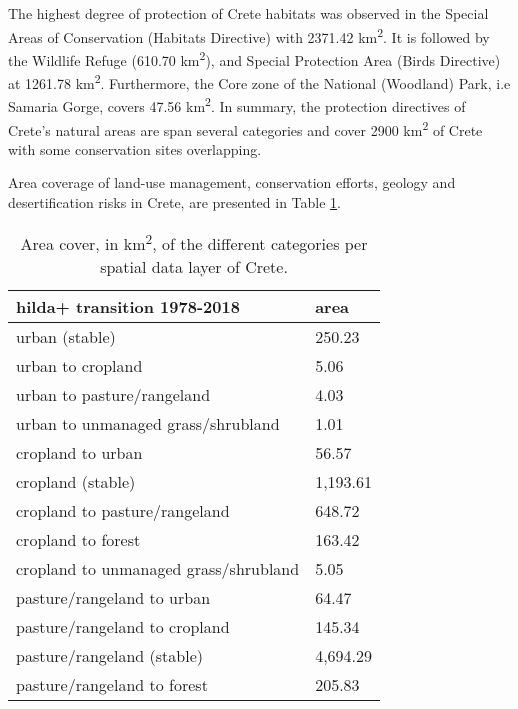 The highest degree of protection of Crete habitats was observed in the Special Areas
of Conservation (Habitats Directive) with 2371.42 km\textsuperscript{2}.
It is followed by the Wildlife Refuge (610.70 km\textsuperscript{2}),
and Special Protection Area (Birds Directive) at 1261.78 km\textsuperscript{2}.
Furthermore, the Core zone of the National (Woodland) Park, i.e Samaria Gorge, covers 47.56 km\textsuperscript{2}.
In summary, the protection directives of Crete's natural areas are span several categories and cover 2900 km\textsuperscript{2}
of Crete with some conservation sites overlapping.

Area coverage of land-use management, conservation efforts, geology and
desertification risks in Crete, are presented in Table \ref{table:crete_data_cube_area}.

\begin{longtable}{ll}
    \caption{Area cover, in km\textsuperscript{2}, of the different categories per spatial data layer of Crete. \label{table:crete_data_cube_area}} \\
\textbf{hilda+ transition 1978-2018}               & \textbf{area}    \\
\endfirsthead
%
\endhead
%
urban (stable)                                     & 250.23           \\
urban to cropland                                  & 5.06             \\
urban to pasture/rangeland                         & 4.03             \\
urban to unmanaged grass/shrubland                 & 1.01             \\
cropland to urban                                  & 56.57            \\
cropland (stable)                                  & 1,193.61         \\
cropland to pasture/rangeland                      & 648.72           \\
cropland to forest                                 & 163.42           \\
cropland to unmanaged grass/shrubland              & 5.05             \\
pasture/rangeland to urban                         & 64.47            \\
pasture/rangeland to cropland                      & 145.34           \\
pasture/rangeland (stable)                         & 4,694.29         \\
pasture/rangeland to forest                        & 205.83           \\

\end{longtable}
